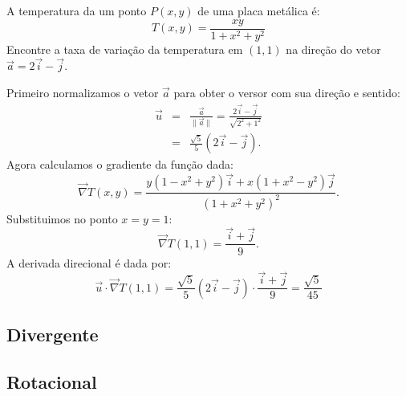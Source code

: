 \begin{exeresol}
A temperatura da um ponto $P(x, y)$ de uma placa metálica é:
$$T(x, y) = \frac{xy}{1+x^2+y^2}$$
Encontre a taxa de variação da temperatura em $(1, 1)$ na direção do vetor $\vec{a}=2\vec{i}-\vec{j}$.
\end{exeresol}
\begin{resol}
Primeiro normalizamos o vetor $\vec{a}$ para obter o versor com sua direção e sentido:
\begin{eqnarray*}
\vec{u}&=&\frac{\vec{a}}{\|\vec{a}\|}=\frac{2\vec{i}-\vec{j}}{\sqrt{2^2+1^2}}\\
&=&\frac{\sqrt{5}}{5}\left(2\vec{i}-\vec{j}\right).
\end{eqnarray*}
Agora calculamos o gradiente da função dada:
$$\vec{\nabla}T(x, y) = \frac{y(1-x^2+y^2)\vec{i} + x(1+x^2-y^2)\vec{j}}{\left(1+x^2+y^2\right)^2}.$$
Substituimos no ponto $x=y=1$:
$$\vec{\nabla}T(1, 1) = \frac{\vec{i} + \vec{j}}{9}.$$
A derivada direcional é dada por:
$$\vec{u}\cdot\vec{\nabla}T(1,1) = \frac{\sqrt{5}}{5}\left(2\vec{i}-\vec{j}\right)\cdot \frac{\vec{i} + \vec{j}}{9}=\frac{\sqrt{5}}{45}$$
\end{resol}

\subsection{Divergente}
\subsection{Rotacional}
